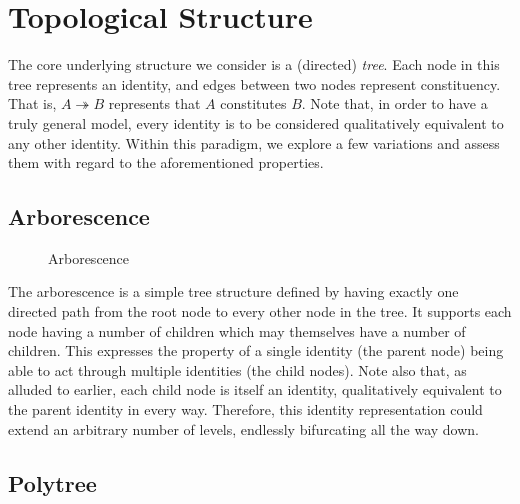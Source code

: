 \documentclass[pra,twocolumn,groupedaddress,10pt]{revtex4}
\theoremstyle{definition}
\begin{document}
\section{Topological Structure} \label{sec:topstr}

The core underlying structure we consider is a (directed) \textit{tree}. Each node in this tree represents an identity, and edges between two nodes represent constituency. That is, $A \twoheadrightarrow B$ represents that $A$ constitutes $B$. Note that, in order to have a truly general model, every identity is to be considered qualitatively equivalent to any other identity. Within this paradigm, we explore a few variations and assess them with regard to the aforementioned properties.

\subsection{Arborescence} \label{sec:arborescence}

\begin{figure}[htp]
\centering
{}
\caption{\label{fig:arborescence}Arborescence}
\end{figure}

The arborescence\cite{arborescence} is a simple tree structure defined by having exactly one directed path from the root node to every other node in the tree. It supports each node having a number of children which may themselves have a number of children. This expresses the property of a single identity (the parent node) being able to act through multiple identities (the child nodes). Note also that, as alluded to earlier, each child node is itself an identity, qualitatively equivalent to the parent identity in every way. Therefore, this identity representation could extend an arbitrary number of levels, endlessly bifurcating all the way down.

\subsection{Polytree} \label{sec:polytree}
\end{document}
